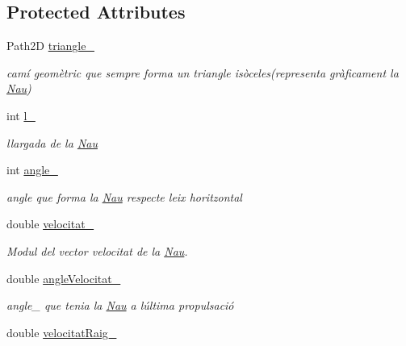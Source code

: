 \subsection*{Protected Attributes}
\begin{DoxyCompactItemize}
\item 
Path2\+D \hyperlink{class_nau_ad397487e3dc0062cc71fdfc4c562e347}{triangle\+\_\+}
\begin{DoxyCompactList}\small\item\em camí geomètric que sempre forma un triangle isòceles(representa gràficament la \hyperlink{class_nau}{Nau}) \end{DoxyCompactList}\item 
int \hyperlink{class_nau_a67c5417119c7e520e1876a919119867d}{l\+\_\+}
\begin{DoxyCompactList}\small\item\em llargada de la \hyperlink{class_nau}{Nau} \end{DoxyCompactList}\item 
int \hyperlink{class_nau_a7bdee12f00bd2087872ff3018144799e}{angle\+\_\+}
\begin{DoxyCompactList}\small\item\em angle que forma la \hyperlink{class_nau}{Nau} respecte l\textquotesingle{}eix horitzontal \end{DoxyCompactList}\item 
double \hyperlink{class_nau_ac1151817b8deaed7c77ceba3141b86e5}{velocitat\+\_\+}
\begin{DoxyCompactList}\small\item\em Modul del vector velocitat de la \hyperlink{class_nau}{Nau}. \end{DoxyCompactList}\item 
double \hyperlink{class_nau_aa2ee3693a5f2a95449e0310f34d9fad4}{angle\+Velocitat\+\_\+}
\begin{DoxyCompactList}\small\item\em angle\+\_\+ que tenia la \hyperlink{class_nau}{Nau} a l\textquotesingle{}última propulsació \end{DoxyCompactList}\item 
double \hyperlink{class_nau_a1400505da3bafa2056c8e542a7811b33}{velocitat\+Raig\+\_\+}
\end{DoxyCompactItemize}
